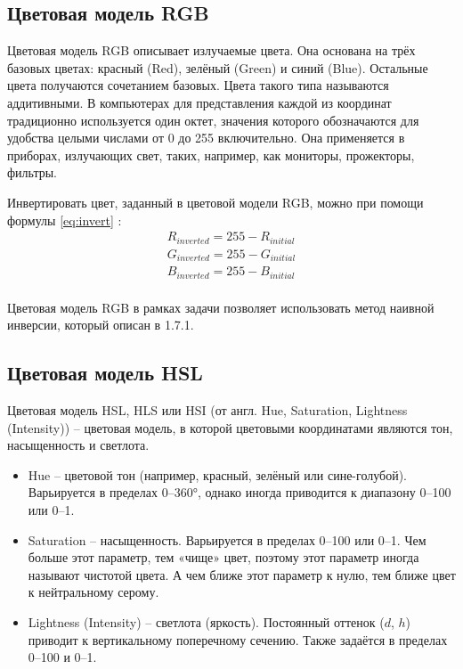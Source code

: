 \subsection{Цветовая модель RGB}

Цветовая модель RGB описывает излучаемые цвета. Она основана на трёх базовых цветах: красный (Red), зелёный (Green) и синий (Blue). Остальные цвета получаются сочетанием базовых. Цвета такого типа называются аддитивными. В компьютерах для представления каждой из координат традиционно используется один октет, значения которого обозначаются для удобства целыми числами от 0 до 255 включительно. Она применяется в приборах, излучающих свет, таких, например, как мониторы, прожекторы, фильтры.

Инвертировать цвет, заданный в цветовой модели  RGB, можно при помощи формулы \ref{eq:invert} \cite{inverse}:
\begin{equation}
	\label{eq:invert}
	\begin{split}
		R_{inverted} = 255 - R_{initial} \\
		G_{inverted} = 255 - G_{initial} \\
		B_{inverted} = 255 - B_{initial} \\
	\end{split}
\end{equation}

Цветовая модель RGB в рамках задачи позволяет использовать метод наивной инверсии, который описан в 1.7.1.

\subsection{Цветовая модель HSL}

Цветовая модель HSL, HLS или HSI (от англ. Hue, Saturation, Lightness (Intensity)) -- цветовая модель, в которой цветовыми координатами являются тон, насыщенность и светлота.

\begin{itemize}
	\item Hue -- цветовой тон (например, красный, зелёный или сине-голубой). Варьируется в пределах 0--360°, однако иногда приводится к диапазону 0--100 или 0--1.
	\item Saturation -- насыщенность. Варьируется в пределах 0--100 или 0--1. Чем больше этот параметр, тем «чище» цвет, поэтому этот параметр иногда называют чистотой цвета. А чем ближе этот параметр к нулю, тем ближе цвет к нейтральному серому.
	\item Lightness (Intensity) -- светлота (яркость). Постоянный оттенок ($d$, $h$) приводит к вертикальному поперечному сечению. Также задаётся в пределах 0--100 и 0--1.
\end{itemize}

